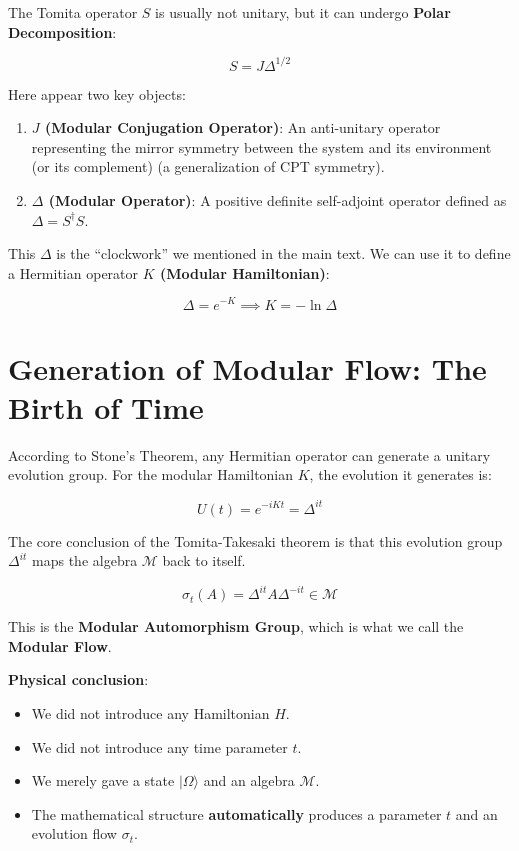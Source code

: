 \documentclass[11pt,a4paper,twoside]{book}
\begin{document}
The Tomita operator $S$ is usually not unitary, but it can undergo \textbf{Polar Decomposition}:

$$S = J \Delta^{1/2}$$

Here appear two key objects:

\begin{enumerate}
\item \textbf{$J$ (Modular Conjugation Operator)}: An anti-unitary operator representing the mirror symmetry between the system and its environment (or its complement) (a generalization of CPT symmetry).

\item \textbf{$\Delta$ (Modular Operator)}: A positive definite self-adjoint operator defined as $\Delta = S^\dagger S$.
\end{enumerate}

This $\Delta$ is the ``clockwork'' we mentioned in the main text. We can use it to define a Hermitian operator \textbf{$K$ (Modular Hamiltonian)}:

$$\Delta = e^{-K} \implies K = -\ln \Delta$$

\section{Generation of Modular Flow: The Birth of Time}

According to Stone's Theorem, any Hermitian operator can generate a unitary evolution group. For the modular Hamiltonian $K$, the evolution it generates is:

$$U(t) = e^{-iKt} = \Delta^{it}$$

The core conclusion of the Tomita-Takesaki theorem is that this evolution group $\Delta^{it}$ maps the algebra $\mathcal{M}$ back to itself.

$$\sigma_t(A) = \Delta^{it} A \Delta^{-it} \in \mathcal{M}$$

This is the \textbf{Modular Automorphism Group}, which is what we call the \textbf{Modular Flow}.

\textbf{Physical conclusion}:

\begin{itemize}
\item We did not introduce any Hamiltonian $H$.

\item We did not introduce any time parameter $t$.

\item We merely gave a state $|\Omega\rangle$ and an algebra $\mathcal{M}$.

\item The mathematical structure \textbf{automatically} produces a parameter $t$ and an evolution flow $\sigma_t$.
\end{itemize}
\end{document}
